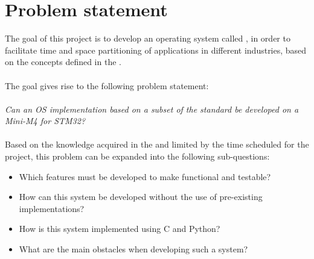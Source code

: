 \chapter{Problem statement}
\label{chap:Problem_Statement}

The goal of this project is to develop an \arinc{}
operating system called \OSname{},
in order to facilitate time and space partitioning of applications
in different industries,
based on the concepts defined in the
.
\\\\
The goal gives rise to the following problem statement:
\\\\
\textit{Can an OS implementation based on a subset of the \arinc{} standard be
developed on a Mini-M4 for STM32?}
\\\\
Based on the knowledge acquired in the 
and limited by the time scheduled for the project, this problem can be expanded
into the following sub-questions:

\begin{itemize}
	\item Which features must be developed to make \OSname{} functional and
		testable?
	\item How can this system be developed without the use of pre-existing
		implementations?
	\item How is this system implemented using C and Python?
	\item What are the main obstacles when developing such a system?
\end{itemize}

